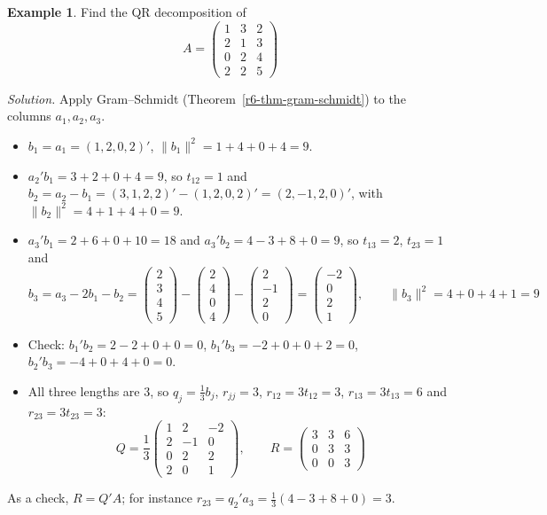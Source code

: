 \documentclass[12pt]{article}
\theoremstyle{definition}
\newtheorem{example}[theorem]{Example}
\begin{document}
\begin{example}\label{r6-exm-qr}
Find the QR decomposition of
\[
A=\begin{pmatrix}1&3&2\\2&1&3\\0&2&4\\2&2&5\end{pmatrix}
\]

\textit{Solution.} Apply Gram--Schmidt (Theorem~\ref{r6-thm-gram-schmidt}) to the columns
\(a_1,a_2,a_3\).
\begin{itemize}
\item \(b_1=a_1=(1,2,0,2)'\), \(\lVert b_1\rVert^2=1+4+0+4=9\).
\item \(a_2'b_1=3+2+0+4=9\), so \(t_{12}=1\) and \(b_2=a_2-b_1=(3,1,2,2)'-(1,2,0,2)'=(2,-1,2,0)'\), with
\(\lVert b_2\rVert^2=4+1+4+0=9\).
\item \(a_3'b_1=2+6+0+10=18\) and \(a_3'b_2=4-3+8+0=9\), so \(t_{13}=2\), \(t_{23}=1\) and
\[
b_3=a_3-2b_1-b_2=\begin{pmatrix}2\\3\\4\\5\end{pmatrix}-\begin{pmatrix}2\\4\\0\\4\end{pmatrix}-\begin{pmatrix}2\\-1\\2\\0\end{pmatrix}
=\begin{pmatrix}-2\\0\\2\\1\end{pmatrix},\qquad\lVert b_3\rVert^2=4+0+4+1=9
\]
\item Check: \(b_1'b_2=2-2+0+0=0\), \(b_1'b_3=-2+0+0+2=0\), \(b_2'b_3=-4+0+4+0=0\).
\item All three lengths are \(3\), so \(q_j=\frac13b_j\), \(r_{jj}=3\), \(r_{12}=3t_{12}=3\), \(r_{13}=3t_{13}=6\)
and \(r_{23}=3t_{23}=3\):
\[
Q=\frac13\begin{pmatrix}1&2&-2\\2&-1&0\\0&2&2\\2&0&1\end{pmatrix},\qquad
R=\begin{pmatrix}3&3&6\\0&3&3\\0&0&3\end{pmatrix}
\]
\end{itemize}
As a check, \(R=Q'A\); for instance \(r_{23}=q_2'a_3=\frac13(4-3+8+0)=3\).
\end{example}
\end{document}
